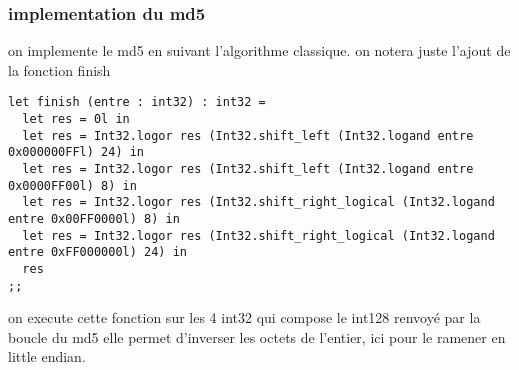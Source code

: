     \subsubsection{implementation du md5}
    
    on implemente le md5 en suivant l'algorithme classique. on notera juste l'ajout de la fonction finish
\begin{lstlisting}
let finish (entre : int32) : int32 =
  let res = 0l in
  let res = Int32.logor res (Int32.shift_left (Int32.logand entre 0x000000FFl) 24) in 
  let res = Int32.logor res (Int32.shift_left (Int32.logand entre 0x0000FF00l) 8) in 
  let res = Int32.logor res (Int32.shift_right_logical (Int32.logand entre 0x00FF0000l) 8) in 
  let res = Int32.logor res (Int32.shift_right_logical (Int32.logand entre 0xFF000000l) 24) in 
  res
;;
\end{lstlisting} 

    on execute cette fonction sur les 4 int32 qui compose le int128 renvoyé par la boucle du md5 elle permet d'inverser les octets de l'entier, ici pour le ramener en little endian.